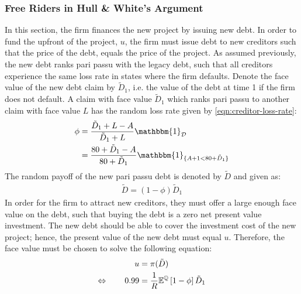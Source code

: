 \documentclass[main.tex]{subfiles}
\begin{document}
    \subsubsection{Free Riders in Hull \& White's Argument}
    \label{sec:example-risk-free-project-debt-issuance}
        In this section, the firm finances the new project by issuing new debt.
        In order to fund the upfront of the project, $u$, 
        the firm must issue debt to new creditors such that the price of the debt, 
        equals the price of the project.
        As assumed previously, the new debt ranks pari passu with the legacy debt, 
        such that all creditors experience the same loss rate in states where the firm defaults.
        Denote the face value of the new debt claim by $\tilde{D}_{1}$, 
        i.e. the value of the debt at time 1 if the firm does not default. 
        A claim with face value $\tilde{D}_{1}$ which ranks pari passu to another claim 
        with face value $L$ has the random loss rate given by \cref{eqn:creditor-loss-rate}:
            \begin{align*}
                \phi
                &=
                    \frac{
                        \tilde{D}_{1} + L - A
                    }{
                        \tilde{D}_{1} + L
                    }
                    \mathbbm{1}_{\mathcal{D}}
                \nonumber \\
                &=
                    \frac{
                        \num{80} + \tilde{D}_{1} - A
                    }{
                        \num{80} + \tilde{D}_{1}
                    }
                    \mathbbm{1}_{\{A + \num{1} < \num{80} + \tilde{D}_{1}\}} 
            \end{align*}
        The random payoff of the new pari passu debt is denoted by $\tilde{D}$ and given as:
            \begin{align*}
                \tilde{D}
                    = (1 - \phi)\tilde{D}_{1}
            \end{align*}
        In order for the firm to attract new creditors,
        they must offer a large enough face value on the debt, 
        such that buying the debt is a zero net present value investment.
        The new debt should be able to cover the investment cost of the new project;
        hence, the present value of the new debt must equal $u$.
        Therefore, the face value must be chosen to solve the following equation:
            \begin{align*}
                u &= \pi(\tilde{D}) \\
                \Leftrightarrow  \qquad
                \num{0.99} 
                &= 
                    \frac{1}{R}
                    \mathbb{E}^{\mathbb{Q}}\left[
                        1 - \phi
                    \right] 
                    \tilde{D}_{1}
            \end{align*}
\end{document}
